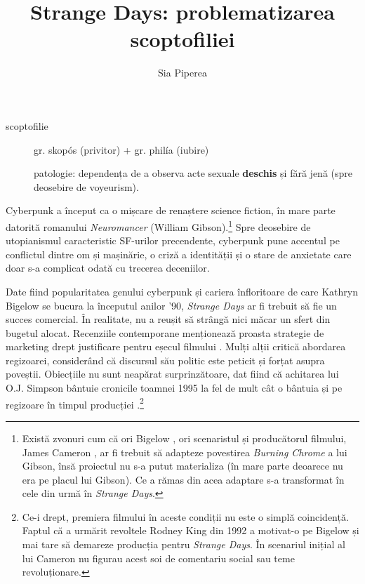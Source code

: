 \documentclass[12pt]{article}
\title{\textbf{Strange Days: problematizarea scoptofiliei}}
\author{Sia Piperea}
\date{} %
\begin{document}
	 	
\maketitle

\begin{description}
	\item[scoptofilie]\par
	gr. \dedouble skopós\sqtworight\: (privitor) + gr. \dedouble philía\sqtworight\: (iubire) \par
	patologie: dependența de a observa acte sexuale  \textbf{deschis} și fără jenă (spre deosebire de voyeurism). \par
\end{description}
		 	
Cyberpunk a început ca o mișcare de renaștere science fiction, în mare parte datorită romanului \textit{Neuromancer} (William Gibson).\footnote{Există zvonuri cum că ori Bigelow \cite{Salza1994a}, ori scenaristul și producătorul filmului, James Cameron \cite{Henry2023a}, ar fi trebuit să adapteze povestirea \textit{Burning Chrome} a lui Gibson, însă proiectul nu s-a putut materializa (în mare parte deoarece nu era pe placul lui Gibson). Ce a rămas din acea adaptare s-a transformat în cele din urmă în \textit{Strange Days}.} Spre deosebire de utopianismul caracteristic SF-urilor precendente, cyberpunk pune accentul pe conflictul dintre om și mașinărie, o criză a identității și o stare de anxietate care doar s-a complicat odată cu trecerea deceniilor.\par

Date fiind popularitatea genului cyberpunk și cariera înfloritoare de care Kathryn Bigelow se bucura la începutul anilor '90, \textit{Strange Days} ar fi trebuit să fie un succes comercial. În realitate, nu a reușit să strângă nici măcar un sfert din bugetul alocat. Recenziile contemporane menționează proasta strategie de marketing drept justificare pentru eșecul filmului \cite{McCarthy1995a}. Mulți alții critică abordarea regizoarei, considerând că discursul său politic este peticit și forțat asupra poveștii. Obiecțiile nu sunt neapărat surprinzătoare, dat fiind că achitarea lui O.J. Simpson bântuie cronicile toamnei 1995 la fel de mult cât o bântuia și pe regizoare în timpul producției \cite{Willistein1995a}.\footnote{Ce-i drept, premiera filmului în aceste condiții nu este o simplă coincidență. Faptul că a urmărit revoltele Rodney King din 1992 a motivat-o pe Bigelow și mai tare să demareze producția pentru \textit{Strange Days}. În scenariul inițial al lui Cameron nu figurau acest soi de comentariu social sau teme revoluționare.}
\end{document}
